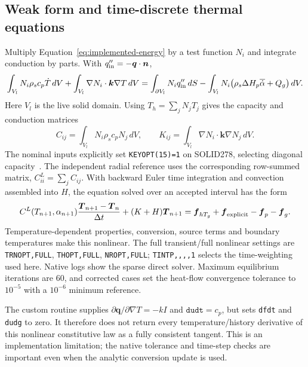 \subsection{Weak form and time-discrete thermal equations}
Multiply Equation~\eqref{eq:implemented-energy} by a test function $N_i$ and integrate conduction by parts. With $q_{\rm in}''=-\boldsymbol q\cdot\boldsymbol n$,
\begin{equation}
 \int_{V_l}N_i\rho_sc_p\dot T\,dV+
 \int_{V_l}\nabla N_i\cdot\boldsymbol k\nabla T\,dV
 =\int_{\partial V_l}N_iq_{\rm in}''\,dS
 -\int_{V_l}N_i\bigl(\rho_s\Delta H_p\overline{\dot\alpha}+Q_g\bigr)\,dV.
\end{equation}
Here $V_l$ is the live solid domain. Using $T_h=\sum_jN_jT_j$ gives the capacity and conduction matrices
\begin{equation}
 C_{ij}=\int_{V_l}N_i\rho_sc_pN_j\,dV,\qquad
 K_{ij}=\int_{V_l}\nabla N_i\cdot\boldsymbol k\nabla N_j\,dV.
\end{equation}
The nominal inputs explicitly set \texttt{KEYOPT(15)=1} on SOLID278, selecting diagonal capacity~\cite{ansyssolid}. The independent radial reference uses the corresponding row-summed matrix, $C^L_{ii}=\sum_jC_{ij}$. With backward Euler time integration and convection assembled into $H$, the equation solved over an accepted interval has the form
\begin{equation}
 C^L(T_{n+1},\alpha_{n+1})\frac{\boldsymbol T_{n+1}-\boldsymbol T_n}{\Delta t}
 +(K+H)\boldsymbol T_{n+1}
 =\boldsymbol f_{hT_g}+\boldsymbol f_{\rm explicit}-\boldsymbol f_p-\boldsymbol f_g.
\end{equation}
Temperature-dependent properties, conversion, source terms and boundary temperatures make this nonlinear. The full transient/full nonlinear settings are \texttt{TRNOPT,FULL}, \texttt{THOPT,FULL}, \texttt{NROPT,FULL}; \texttt{TINTP,,,,1} selects the time-weighting used here. Native logs show the sparse direct solver. Maximum equilibrium iterations are 60, and corrected cases set the heat-flow convergence tolerance to $10^{-5}$ with a $10^{-6}$ minimum reference.

The custom routine supplies $\partial\boldsymbol q/\partial\nabla T=-kI$ and $\texttt{dudt}=c_p$, but sets \texttt{dfdt} and \texttt{dudg} to zero. It therefore does not return every temperature/history derivative of this nonlinear constitutive law as a fully consistent tangent. This is an implementation limitation; the native tolerance and time-step checks are important even when the analytic conversion update is used.

